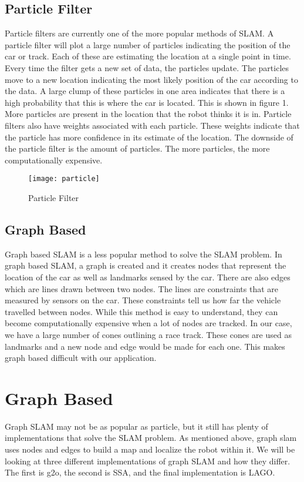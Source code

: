 \documentclass[10pt, onecolumn, draftclsnofoot, letterpaper,compsoc]{IEEEtran}
\begin{document}
\subsection{Particle Filter}
Particle filters are currently one of the more popular methods of SLAM. A particle filter will plot a large number of particles indicating the position of the car or track. Each of these are estimating the location at a single point in time. Every time the filter gets a new set of data, the particles update. The particles move to a new location indicating the most likely position of the car according to the data. A large clump of these particles in one area indicates that there is a high probability that this is where the car is located. This is shown in figure 1. More particles are present in the location that the robot thinks it is in. Particle filters also have weights associated with each particle. These weights indicate that the particle has more confidence in its estimate of the location. The downside of the particle filter is the amount of particles. The more particles, the more computationally expensive.
\begin{figure}
\centering
\texttt{[image: particle]}
\caption{Particle Filter \citep{mathworks}}
\label{fig:particle}
\end{figure}

\subsection{Graph Based}
Graph based SLAM is a less popular method to solve the SLAM problem. In graph based SLAM, a graph is created and it creates nodes that represent the location of the car as well as landmarks sensed by the car. There are also edges which are lines drawn between two nodes. The lines are constraints that are measured by sensors on the car. These constraints tell us how far the vehicle travelled between nodes\citep{graphslam}. While this method is easy to understand, they can become computationally expensive when a lot of nodes are tracked. In our case, we have a large number of cones outlining a race track. These cones are used as landmarks and a new node and edge would be made for each one. This makes graph based difficult with our application.

\section{Graph Based}
Graph SLAM may not be as popular as particle, but it still has plenty of implementations that solve the SLAM problem. As mentioned above, graph slam uses nodes and edges to build a map and localize the robot within it. We will be looking at three different implementations of graph SLAM and how they differ. The first is g2o, the second is SSA, and the final implementation is LAGO.
\end{document}
